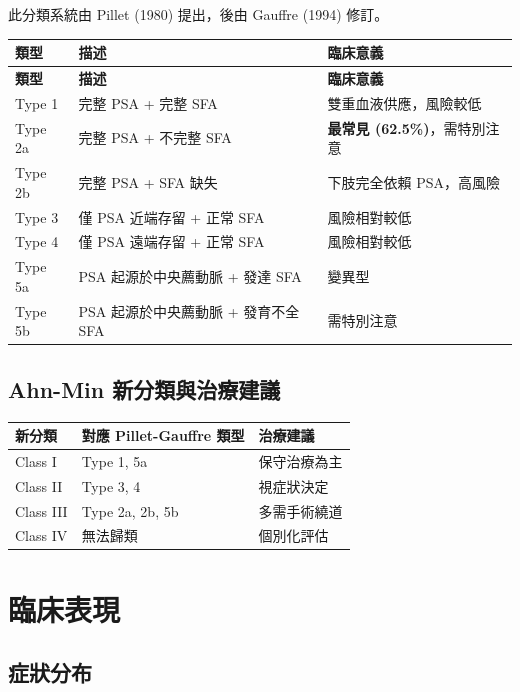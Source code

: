 \documentclass[12pt,a4paper]{article}
\begin{document}
此分類系統由 Pillet (1980) 提出，後由 Gauffre (1994) 修訂。

\begin{longtable}{p{2cm}p{6cm}p{6cm}}
\toprule
\textbf{類型} & \textbf{描述} & \textbf{臨床意義} \\
\midrule
\endfirsthead
\toprule
\textbf{類型} & \textbf{描述} & \textbf{臨床意義} \\
\midrule
\endhead
\bottomrule
\endlastfoot
Type 1 & 完整 PSA + 完整 SFA & 雙重血液供應，風險較低 \\
\midrule
Type 2a & 完整 PSA + 不完整 SFA & \textbf{最常見 (62.5\%)}，需特別注意 \\
\midrule
Type 2b & 完整 PSA + SFA 缺失 & 下肢完全依賴 PSA，高風險 \\
\midrule
Type 3 & 僅 PSA 近端存留 + 正常 SFA & 風險相對較低 \\
\midrule
Type 4 & 僅 PSA 遠端存留 + 正常 SFA & 風險相對較低 \\
\midrule
Type 5a & PSA 起源於中央薦動脈 + 發達 SFA & 變異型 \\
\midrule
Type 5b & PSA 起源於中央薦動脈 + 發育不全 SFA & 需特別注意 \\
\end{longtable}

\subsection{Ahn-Min 新分類與治療建議}

\begin{longtable}{p{2.5cm}p{5cm}p{6.5cm}}
\toprule
\textbf{新分類} & \textbf{對應 Pillet-Gauffre 類型} & \textbf{治療建議} \\
\midrule
\endfirsthead
\bottomrule
\endlastfoot
Class I & Type 1, 5a & 保守治療為主 \\
\midrule
Class II & Type 3, 4 & 視症狀決定 \\
\midrule
Class III & Type 2a, 2b, 5b & 多需手術繞道 \\
\midrule
Class IV & 無法歸類 & 個別化評估 \\
\end{longtable}

\section{臨床表現}

\subsection{症狀分布}
\end{document}

